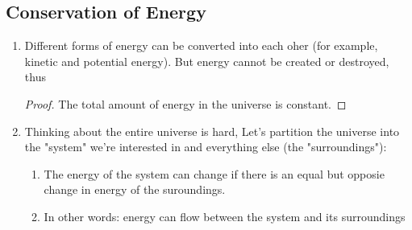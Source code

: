 \documentclass{article}  %
\newtheorem{proof}{Statement}
\begin{document}
\subsection*{Conservation of Energy}
\begin{enumerate}
    \item Different forms of energy can be converted into each oher (for example, kinetic and potential energy). But energy cannot be created or destroyed, thus
    \begin{proof}
        The total amount of energy in the universe is constant.
    \end{proof}
    \item Thinking about the entire universe is hard, Let's partition the universe into the "system" we're interested in and everything else (the "surroundings"):
        \begin{enumerate}
            \item The energy of the system can change if there is an equal but opposie change in energy of the suroundings.
            \item In other words: energy can flow between the system and its surroundings
        \end{enumerate}
\end{enumerate}
\end{document}

